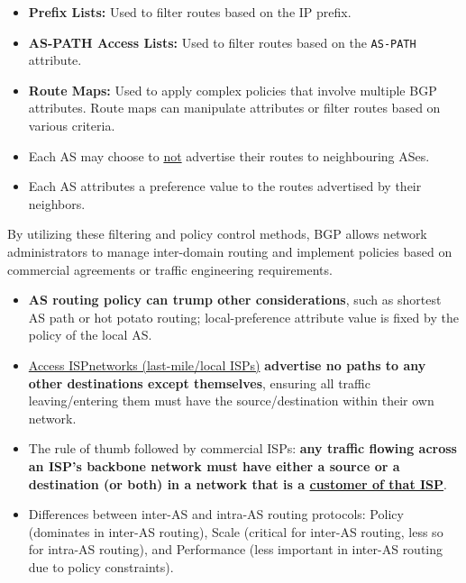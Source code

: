 \begin{itemize}
    \item \textbf{Prefix Lists:} Used to filter routes based on the IP prefix.
    
    \item \textbf{AS-PATH Access Lists:} Used to filter routes based on the \texttt{AS-PATH} attribute.
    
    \item \textbf{Route Maps:} Used to apply complex policies that involve multiple BGP attributes. Route maps can manipulate attributes or filter routes based on various criteria.

    \item Each AS may choose to \underline{not} advertise their routes to neighbouring ASes.

    \item Each AS attributes a preference value to the routes advertised by their neighbors.
\end{itemize}

\noindent By utilizing these filtering and policy control methods, BGP allows network administrators to manage inter-domain routing and implement policies based on commercial agreements or traffic engineering requirements.

\begin{itemize}
    \item \textbf{AS routing policy can trump other considerations}, such as shortest AS path or hot potato routing; local-preference attribute value is fixed by the policy of the local AS.
    
    \item \underline{Access ISP\footnotemark[4] networks (last-mile/local ISPs)} \textbf{advertise no paths to any other destinations except themselves}, ensuring all traffic leaving/entering them must have the source/destination within their own network.

    \item The rule of thumb followed by commercial ISPs: \textbf{any traffic flowing across an ISP's backbone network must have either a source or a destination (or both) in a network that is a \underline{customer of that ISP}}.
    
    \item Differences between inter-AS and intra-AS routing protocols: Policy (dominates in inter-AS routing), Scale (critical for inter-AS routing, less so for intra-AS routing), and Performance (less important in inter-AS routing due to policy constraints).
\end{itemize}


